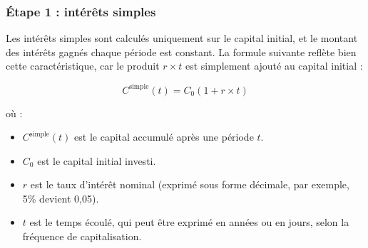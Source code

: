 \documentclass{article}
\begin{document}
\subsubsection*{Étape 1 : intérêts simples}

\begin{tcolorbox}[
        colback=lightgreen, 
        colframe=lightgreen, 
        boxrule=0.5pt, 
        arc=0pt, 
        left=10pt, 
        right=10pt, 
        top=6pt, 
        bottom=6pt, 
        boxsep=2pt, 
        before upper={\faLightbulb\hspace{10pt}}
    ]
        Les intérêts simples sont calculés uniquement sur le capital initial, et le montant des intérêts gagnés chaque période est constant. La formule suivante reflète bien cette caractéristique, car le produit \( r \times t \) est simplement ajouté au capital initial :

        \[
        C^{\text{simple}}(t) = C_0 \left(1 + r \times t\right)
        \]
        
        où :
        \begin{itemize}
            \item \( C^{\text{simple}}(t) \) est le capital accumulé après une période \( t \).
            \item \( C_0 \) est le capital initial investi.
            \item \( r \) est le taux d'intérêt nominal (exprimé sous forme décimale, par exemple, 5\% devient 0,05).
            \item \( t \) est le temps écoulé, qui peut être exprimé en années ou en jours, selon la fréquence de capitalisation.
        \end{itemize}
    \end{tcolorbox}
\end{document}
